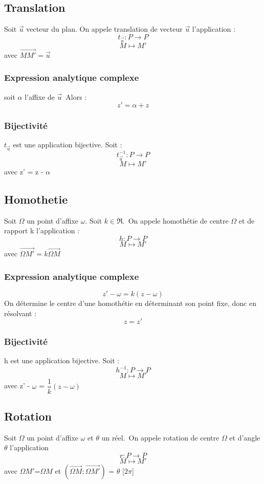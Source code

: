 \subsection{Translation}
\begin{de}
 Soit $\overrightarrow{u}$ vecteur du plan. On appele translation de vecteur $\overrightarrow{u}$ l'application :
$$t_{\overrightarrow{u}} : P \rightarrow P$$
$$M \mapsto M'$$
avec $\overrightarrow{MM'} = \overrightarrow{u}$
\end{de}
\subsubsection{Expression analytique complexe}
soit $\alpha$ l'affixe de $\overrightarrow{u}$\
Alors :
$$z' = \alpha + z$$
\subsubsection{Bijectivité}
$t_{\overrightarrow{u}}$ est une application bijective. Soit :
$$t_{\overrightarrow{u}}^{-1} : P \rightarrow P$$
$$M \mapsto M'$$
avec z' = z - $\alpha$
\subsection{Homothetie}
\begin{de}
 Soit $\Omega$ un point d'affixe $\omega$. Soit $k \in \Re$.\
On appele homothétie de centre $\Omega$ et de rapport k l'application :
$$h :  P \rightarrow P $$
$$M \mapsto M'$$
avec $\overrightarrow{\Omega M'}=k\overrightarrow{\Omega M}$ 
\end{de}
\subsubsection{Expression analytique complexe}
$$z'-\omega = k(z-\omega)$$
On détermine le centre d'une homothétie en déterminant son point fixe, donc en résolvant :
$$z = z'$$
\subsubsection{Bijectivité}
h est une application bijective. Soit :
$$h^{-1} : P \rightarrow P$$
$$M \mapsto M'$$
avec z' - $\omega$ = $\dfrac{1}{k}(z - \omega)$
\subsection{Rotation}
\begin{de}
Soit $\Omega$ un point d'affixe $\omega$ et $\theta$ un réel.\
On appele rotation de centre $\Omega$ et d'angle $\theta$ l'application
$$r : P \rightarrow P$$
$$M \mapsto M'$$
avec $\Omega M'$=$\Omega M$ et $(\overrightarrow{\Omega M};\overrightarrow{\Omega M'})$ = $\theta$ [$2\pi$]
\end{de}
